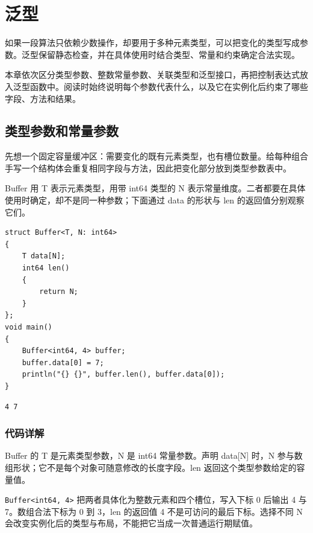 \chapter{泛型}
\label{ch:14}

如果一段算法只依赖少数操作，却要用于多种元素类型，可以把变化的类型写成参数。泛型保留静态检查，并在具体使用时结合类型、常量和约束确定合法实现。

本章依次区分类型参数、整数常量参数、关联类型和泛型接口，再把控制表达式放入泛型函数中。阅读时始终说明每个参数代表什么，以及它在实例化后约束了哪些字段、方法和结果。

\section{类型参数和常量参数}

先想一个固定容量缓冲区：需要变化的既有元素类型，也有槽位数量。给每种组合手写一个结构体会重复相同字段与方法，因此把变化部分放到类型参数表中。

Buffer 用 T 表示元素类型，用带 int64 类型的 N 表示常量维度。二者都要在具体使用时确定，却不是同一种参数；下面通过 data 的形状与 len 的返回值分别观察它们。

\par
\medskip
\begin{lstlisting}[style=chali]
struct Buffer<T, N: int64>
{
    T data[N];
    int64 len()
    {
        return N;
    }
};
void main()
{
    Buffer<int64, 4> buffer;
    buffer.data[0] = 7;
    println("{} {}", buffer.len(), buffer.data[0]);
}
\end{lstlisting}
\par
\medskip

\par
\medskip
\begin{lstlisting}[style=out]
4 7
\end{lstlisting}
\par
\medskip

\subsection*{代码详解}

Buffer 的 T 是元素类型参数，N 是 int64 常量参数。声明 data[N] 时，N 参与数组形状；它不是每个对象可随意修改的长度字段。len 返回这个类型参数给定的容量值。

\texttt{Buffer<\allowbreak{}int64,\allowbreak{} 4>\allowbreak{}} 把两者具体化为整数元素和四个槽位，写入下标 0 后输出 4 与 7。数组合法下标为 0 到 3，len 的返回值 4 不是可访问的最后下标。选择不同 N 会改变实例化后的类型与布局，不能把它当成一次普通运行期赋值。

